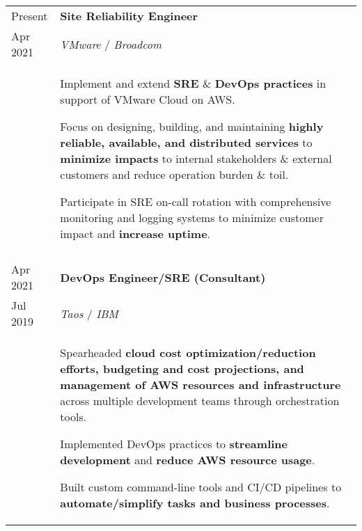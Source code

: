 \documentclass[10pt]{article}
\newcommand{\afterlistspace}[0]{\vspace{-1.5em}}
\begin{document}
\begin{tabular}{p{1.5cm}|p{16cm}}

    Present & \textbf{Site Reliability Engineer}
    \\
    Apr 2021 & \emph{VMware} / \emph{Broadcom}
    \\
    & \begin{itemize}
        \footnotesize{
            \item Implement and extend \textbf{SRE} \& \textbf{DevOps practices} in support of VMware Cloud on AWS.

            \item Focus on designing, building, and maintaining \textbf{highly reliable, available, and distributed services} to \textbf{minimize impacts} to internal stakeholders \& external customers and reduce operation burden \& toil.

            \item Participate in SRE on-call rotation with comprehensive monitoring and logging systems to minimize customer impact and \textbf{increase uptime}.
        }

        \afterlistspace
    \end{itemize}
    
    \\
    \multicolumn{2}{c}{}
    \\

    Apr 2021 & \textbf{DevOps Engineer/SRE (Consultant)}
    \\
    Jul 2019 & \emph{Taos} / \emph{IBM}
    \\
    & \begin{itemize}
        \footnotesize{
            \item Spearheaded \textbf{cloud cost optimization/reduction efforts, budgeting and cost projections, and management of AWS resources and infrastructure} across multiple development teams through orchestration tools.
            
            \item Implemented DevOps practices to \textbf{streamline development} and \textbf{reduce AWS resource usage}.
            
            \item Built custom command-line tools and CI/CD pipelines to \textbf{automate/simplify tasks and business processes}.
        }

        \afterlistspace
    \end{itemize}
    

\end{tabular}
\end{document}
